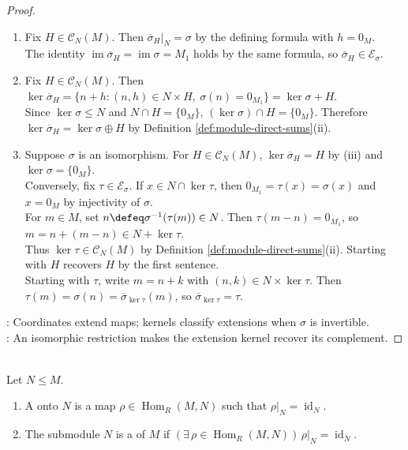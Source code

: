 \begin{theorem}
\begin{proof}
\begin{enumerate}[label=(\roman*)]
\item Fix $H\in\mathcal{C}_N(M)$. Then $\overline{\sigma}_H|_N=\sigma$ by the defining formula with $h=0_M$.\\
The identity $\operatorname{im}\overline{\sigma}_H=\operatorname{im}\sigma=M_1$ holds by the same formula, so $\overline{\sigma}_H\in\mathcal{E}_{\sigma}$.
\item Fix $H\in\mathcal{C}_N(M)$. Then $\ker\overline{\sigma}_H=\{n+h:(n,h)\in N\times H,\ \sigma(n)=0_{M_1}\}=\ker\sigma+H$.\\
Since $\ker\sigma\leq N$ and $N\cap H=\{0_M\}$, $(\ker\sigma)\cap H=\{0_M\}$. Therefore $\ker\overline{\sigma}_H=\ker\sigma\oplus H$ by Definition \ref{def:module-direct-sums}(ii).
\item Suppose $\sigma$ is an isomorphism. For $H\in\mathcal{C}_N(M)$, $\ker\overline{\sigma}_H=H$ by (iii) and $\ker\sigma=\{0_M\}$.\\
Conversely, fix $\tau\in\mathcal{E}_{\sigma}$. If $x\in N\cap\ker\tau$, then $0_{M_1}=\tau(x)=\sigma(x)$ and $x=0_M$ by injectivity of $\sigma$.\\
For $m\in M$, set $n\defeq\sigma^{-1}(\tau(m))\in N$. Then $\tau(m-n)=0_{M_1}$, so $m=n+(m-n)\in N+\ker\tau$.\\
Thus $\ker\tau\in\mathcal{C}_N(M)$ by Definition \ref{def:module-direct-sums}(ii). Starting with $H$ recovers $H$ by the first sentence.\\
Starting with $\tau$, write $m=n+k$ with $(n,k)\in N\times\ker\tau$. Then $\tau(m)=\sigma(n)=\overline{\sigma}_{\ker\tau}(m)$, so $\overline{\sigma}_{\ker\tau}=\tau$.
\end{enumerate}
: Coordinates extend maps; kernels classify extensions when $\sigma$ is invertible.\\
: An isomorphic restriction makes the extension kernel recover its complement.
\end{proof}
\end{theorem}

\begin{definition} \label{def:module-retract} \\
Let $N\leq M$.
\begin{enumerate}[label=(\roman*)]
\setlength{\itemsep}{0pt}
\item A  onto $N$ is a map $\rho\in\operatorname{Hom}_R(M,N)$ such that $\rho|_N=\operatorname{id}_N$.
\item The submodule $N$ is a  of $M$ if $(\exists\,\rho\in\operatorname{Hom}_R(M,N))\,\rho|_N=\operatorname{id}_N$.
\end{enumerate}
\end{definition}

